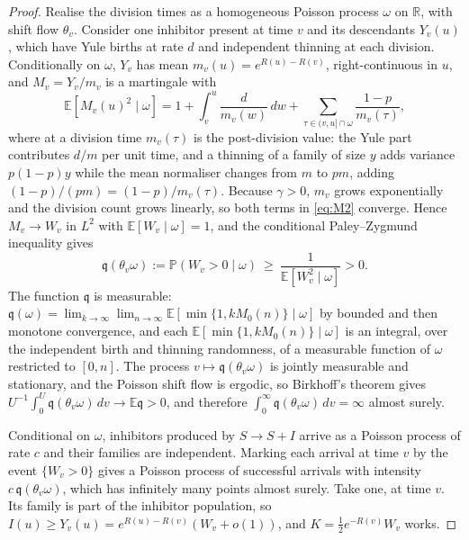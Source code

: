 \documentclass[11pt,a4paper]{article}
\numberwithin{equation}{section}
\theoremstyle{definition}\newtheorem{definition}[theorem]{Definition}
\theoremstyle{remark}\newtheorem{remark}[theorem]{Remark}\newtheorem{example}[theorem]{Example}
\newcommand{\E}{\mathbb E}
\renewcommand{\P}{\mathbb P}
\begin{document}
\begin{proof}
Realise the division times as a homogeneous Poisson process $\omega$ on $\mathbb R$, with shift flow $\theta_v$. Consider one inhibitor present at time $v$ and its descendants $Y_v(u)$, which have Yule births at rate $d$ and independent thinning at each division. Conditionally on $\omega$, $Y_v$ has mean $m_v(u)=e^{R(u)-R(v)}$, right-continuous in $u$, and $M_v=Y_v/m_v$ is a martingale with
\begin{equation}\label{eq:M2}
\E[M_v(u)^2\mid\omega]=1+\int_v^u\frac{d}{m_v(w)}\,dw+\sum_{\tau\in(v,u]\cap\omega}\frac{1-p}{m_v(\tau)},
\end{equation}
where at a division time $m_v(\tau)$ is the post-division value: the Yule part contributes $d/m$ per unit time, and a thinning of a family of size $y$ adds variance $p(1-p)y$ while the mean normaliser changes from $m$ to $pm$, adding $(1-p)/(pm)=(1-p)/m_v(\tau)$. Because $\gamma>0$, $m_v$ grows exponentially and the division count grows linearly, so both terms in \eqref{eq:M2} converge. Hence $M_v\to W_v$ in $L^2$ with $\E[W_v\mid\omega]=1$, and the conditional Paley--Zygmund inequality gives
\[
\mathfrak q(\theta_v\omega):=\P(W_v>0\mid\omega)\ \ge\ \frac{1}{\E[W_v^2\mid\omega]}>0 .
\]
The function $\mathfrak q$ is measurable: $\mathfrak q(\omega)=\lim_{k\to\infty}\lim_{n\to\infty}\E[\min\{1,kM_0(n)\}\mid\omega]$ by bounded and then monotone convergence, and each $\E[\min\{1,kM_0(n)\}\mid\omega]$ is an integral, over the independent birth and thinning randomness, of a measurable function of $\omega$ restricted to $[0,n]$. The process $v\mapsto\mathfrak q(\theta_v\omega)$ is jointly measurable and stationary, and the Poisson shift flow is ergodic, so Birkhoff's theorem gives $U^{-1}\int_0^U\mathfrak q(\theta_v\omega)\,dv\to\E\mathfrak q>0$, and therefore $\int_0^\infty\mathfrak q(\theta_v\omega)\,dv=\infty$ almost surely.

Conditional on $\omega$, inhibitors produced by $S\to S+I$ arrive as a Poisson process of rate $c$ and their families are independent. Marking each arrival at time $v$ by the event $\{W_v>0\}$ gives a Poisson process of successful arrivals with intensity $c\,\mathfrak q(\theta_v\omega)$, which has infinitely many points almost surely. Take one, at time $v$. Its family is part of the inhibitor population, so $I(u)\ge Y_v(u)=e^{R(u)-R(v)}(W_v+o(1))$, and $K=\tfrac12e^{-R(v)}W_v$ works.
\end{proof}
\end{document}
